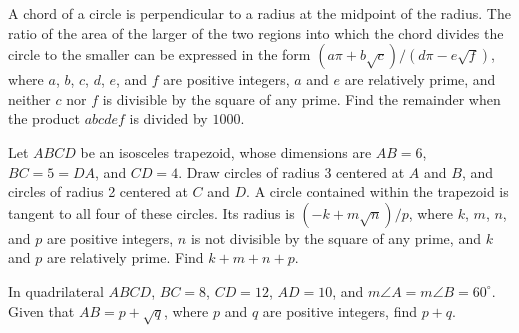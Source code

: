 \begin{question}[name={2004 AIME II, \href{https://artofproblemsolving.com/community/c4p371256}{Problem 1}}]
	A chord of a circle is perpendicular to a radius at the midpoint of the radius. The ratio of the area of the larger of the two regions into which the chord divides the circle to the smaller can be expressed in the form $(a\pi+b\sqrt{c})/(d\pi-e\sqrt{f})$, where $a$, $b$, $c$, $d$, $e$, and $f$ are positive integers, $a$ and $e$ are relatively prime, and neither $c$ nor $f$ is divisible by the square of any prime. Find the remainder when the product $abcdef$ is divided by $1000$.
\end{question}


%	












\begin{question}[name={2004 AIME II, \href{https://artofproblemsolving.com/community/c4p371226}{Problem 12}}]
	Let $ABCD$ be an isosceles trapezoid, whose dimensions are $AB = 6$, $BC=5=DA$, and $CD=4$. Draw circles of radius 3 centered at $A$ and $B$, and circles of radius 2 centered at $C$ and $D$. A circle contained within the trapezoid is tangent to all four of these circles. Its radius is $(-k+m\sqrt{n})/p$, where $k$, $m$, $n$, and $p$ are positive integers, $n$ is not divisible by the square of any prime, and $k$ and $p$ are relatively prime. Find $k+m+n+p$.	
\end{question}


%	
























\begin{question}[name={2005 AIME I, \href{https://artofproblemsolving.com/community/c4p365549}{Problem 7}}]
	In quadrilateral $ABCD$, $BC=8$, $CD=12$, $AD=10$, and $m\angle A= m\angle B = 60^\circ$. Given that $AB=p + \sqrt{q}$, where $p$ and $q$ are positive integers, find $p+q$.	
\end{question}


